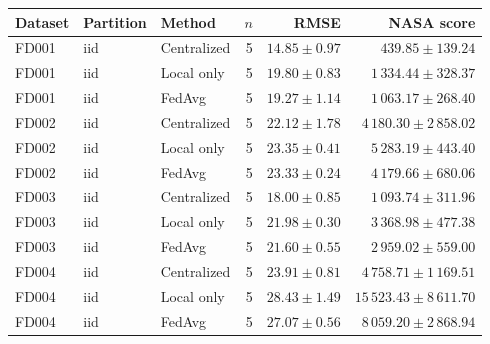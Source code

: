\begin{tabular}{lllrrr}
\toprule
Dataset & Partition & Method & $n$ & RMSE & NASA score \\
\midrule
FD001 & iid & Centralized & 5 & $14.85\pm0.97$ & $439.85\pm139.24$ \\
FD001 & iid & Local only & 5 & $19.80\pm0.83$ & $1\,334.44\pm328.37$ \\
FD001 & iid & FedAvg & 5 & $19.27\pm1.14$ & $1\,063.17\pm268.40$ \\
FD002 & iid & Centralized & 5 & $22.12\pm1.78$ & $4\,180.30\pm2\,858.02$ \\
FD002 & iid & Local only & 5 & $23.35\pm0.41$ & $5\,283.19\pm443.40$ \\
FD002 & iid & FedAvg & 5 & $23.33\pm0.24$ & $4\,179.66\pm680.06$ \\
FD003 & iid & Centralized & 5 & $18.00\pm0.85$ & $1\,093.74\pm311.96$ \\
FD003 & iid & Local only & 5 & $21.98\pm0.30$ & $3\,368.98\pm477.38$ \\
FD003 & iid & FedAvg & 5 & $21.60\pm0.55$ & $2\,959.02\pm559.00$ \\
FD004 & iid & Centralized & 5 & $23.91\pm0.81$ & $4\,758.71\pm1\,169.51$ \\
FD004 & iid & Local only & 5 & $28.43\pm1.49$ & $15\,523.43\pm8\,611.70$ \\
FD004 & iid & FedAvg & 5 & $27.07\pm0.56$ & $8\,059.20\pm2\,868.94$ \\
\bottomrule
\end{tabular}
